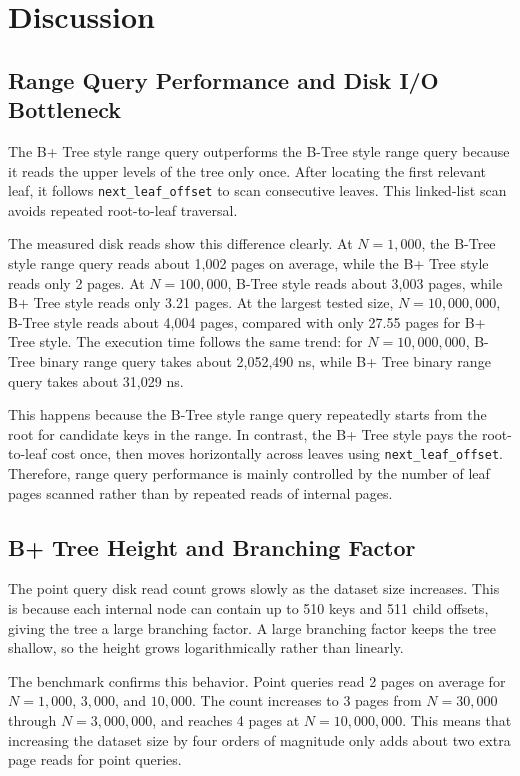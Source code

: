 \documentclass[12pt,a4paper]{article}
\begin{document}
\section{Discussion}

\subsection{Range Query Performance and Disk I/O Bottleneck}

The B+ Tree style range query outperforms the B-Tree style range query because it reads the upper levels of the tree only once. After locating the first relevant leaf, it follows \texttt{next\_leaf\_offset} to scan consecutive leaves. This linked-list scan avoids repeated root-to-leaf traversal.

The measured disk reads show this difference clearly. At $N=1{,}000$, the B-Tree style range query reads about 1,002 pages on average, while the B+ Tree style reads only 2 pages. At $N=100{,}000$, B-Tree style reads about 3,003 pages, while B+ Tree style reads only 3.21 pages. At the largest tested size, $N=10{,}000{,}000$, B-Tree style reads about 4,004 pages, compared with only 27.55 pages for B+ Tree style. The execution time follows the same trend: for $N=10{,}000{,}000$, B-Tree binary range query takes about 2,052,490 ns, while B+ Tree binary range query takes about 31,029 ns.

This happens because the B-Tree style range query repeatedly starts from the root for candidate keys in the range. In contrast, the B+ Tree style pays the root-to-leaf cost once, then moves horizontally across leaves using \texttt{next\_leaf\_offset}. Therefore, range query performance is mainly controlled by the number of leaf pages scanned rather than by repeated reads of internal pages.

\subsection{B+ Tree Height and Branching Factor}

The point query disk read count grows slowly as the dataset size increases. This is because each internal node can contain up to 510 keys and 511 child offsets, giving the tree a large branching factor. A large branching factor keeps the tree shallow, so the height grows logarithmically rather than linearly.

The benchmark confirms this behavior. Point queries read 2 pages on average for $N=1{,}000$, $3{,}000$, and $10{,}000$. The count increases to 3 pages from $N=30{,}000$ through $N=3{,}000{,}000$, and reaches 4 pages at $N=10{,}000{,}000$. This means that increasing the dataset size by four orders of magnitude only adds about two extra page reads for point queries.
\end{document}
